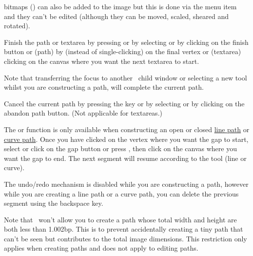 \Glspl{bitmap} () can also be added to
the image but this is done via the  menu item
and they can't be edited (although they can be moved, scaled,
sheared and rotated).


Finish the \gls{path} or \gls{textarea} by pressing
 or by selecting 
or by clicking on the finish button or (\gls{path}) by
 (instead of single-clicking)
on the final vertex or (\gls{textarea}) clicking on the \gls{canvas}
where you want the next \gls{textarea} to start.  

Note that transferring the focus to
another \FlowframTk\ child window or selecting a new tool whilst you
are constructing a \gls{path}, will complete the current path.


Cancel the current \gls{path} by pressing the
 key or by selecting
 or by clicking on the abandon path button.
(Not applicable for \glspl{textarea}.)


The  or  function is only
available when constructing an open or closed
\hyperref[sec:newlinepath]{line path} or \hyperref[sec:newcurvepath]{curve
path}.  Once you have clicked on the vertex where you want the
\gls{gap} to start, select  or click on the
\gls{gap} button or press , then click
on the \gls{canvas} where you want the \gls{gap} to end. The next
segment will resume according to the tool (line or curve).

\begin{warning}
The undo/redo mechanism is disabled while you are constructing a
path, however while you are creating a line path or a curve path,
you can delete the previous segment using the
backspace  key.
\end{warning}

Note that \FlowframTk\ won't allow you to create a \gls{path} whose
total width and height are both less than 1.002\gls{bp}. This is to
prevent accidentally creating a tiny path that can't be seen but
contributes to the total image dimensions. This restriction only
applies when creating \glspl*{path} and does not apply to editing
paths.

